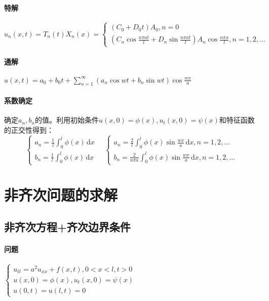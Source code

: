 \paragraph{特解}\(u_n(x,t)=T_n(t)X_n(x)=\begin{cases}
(C_0+D_0t)A_0,n=0\\
(C_n\cos\frac{n\pi at}{l}+D_n\sin\frac{n\pi at}{l})A_n\cos\frac{n\pi x}{l},n=1,2,\ldots
\end{cases}\)

\paragraph{通解}\(u(x,t)=a_0+b_0t+\sum\limits_{n=1}^{\infty}{\left(a_n\cos{w t}+b_n\sin{w t}\right)\cos{\frac{wx}{a}}}\)

\paragraph{系数确定}确定\(a_n,b_n\)的值。利用初始条件\(u(x,0)=\phi(x),u_t(x,0)=\psi(x)\)和特征函数的正交性得到：
\[
\begin{cases}
a_n=\frac{1}{l}\int_0^l\phi(x)\,\mathrm{d}x\\
b_n=\frac{1}{l}\int_0^l\phi(x)\,\mathrm{d}x
\end{cases}\quad
\begin{cases}
a_n=\frac{2}{l}\int_0^l\phi(x)\sin\frac{wx}{a}\,\mathrm{d}x,n=1,2,\ldots\\
b_n=\frac{2}{n\pi a}\int_0^l\phi(x)\sin\frac{wx}{a}\,\mathrm{d}x,n=1,2,\ldots
\end{cases}
\]

\section{非齐次问题的求解}

\subsection{非齐次方程+齐次边界条件}

\paragraph{问题}\(\begin{cases}u_{tt}=a^2u_{xx}+f(x,t),0<x<l,t>0\\u(x,0)=\phi(x),u_t(x,0)=\psi(x)\\u(0,t)=u(l,t)=0\end{cases}\)

